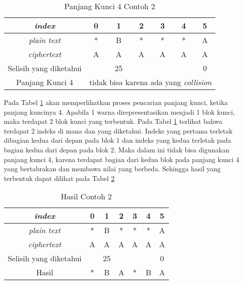 	\begin{table}[H]
	 	\centering
	 	\caption{Panjang Kunci 4 Contoh 2}
	 	\setlength{\arrayrulewidth}{.08em}
	 	\begin{tabular}{|c|c|c|c|c|c|c|}\hline
		\textit{index}&0&1&2&3&4&5\\ \hline
	 	\textit{plain text}&\cellcolor{blue!15}*&\cellcolor{blue!15}B&\cellcolor{blue!15}*&\cellcolor{blue!15}*&\cellcolor{green!15}*&\cellcolor{green!15}A\\ \hline
	 	\textit{ciphertext}&\cellcolor{blue!15}A&\cellcolor{blue!15}A&\cellcolor{blue!15}A&\cellcolor{blue!15}A&\cellcolor{green!15}A&\cellcolor{green!15}A\\ \hline
	 	Selisih yang diketahui& &25& & & &0\\ \hline
	 	Panjang Kunci 4 & \multicolumn{6}{c|}{tidak bisa karena ada yang \textit{collision}}\\ \hline
	 	\end{tabular}
	 	\label{tab:k4contoh2}
	\end{table}	
	Pada Tabel \ref{tab:k4contoh2} akan memperlihatkan proses pencarian panjang kunci, ketika panjang kuncinya 4. Apabila 1 warna direpresentasikan menjadi 1 blok kunci, maka terdapat 2 blok kunci yang terbentuk. Pada Tabel \ref{tab:k4contoh2} terlihat bahwa terdapat 2 indeks di mana \plaintext dan \ciphertext yang diketahui. Indeks yang pertama terletak dibagian kedua dari depan pada blok 1 dan indeks yang kedua terletak pada bagian kedua dari depan pada blok 2. Maka dalam ini tidak bisa digunakan panjang kunci 4, karena terdapat bagian dari kedua blok pada panjang kunci 4 yang bertabrakan dan membawa nilai yang berbeda. Sehingga hasil yang terbentuk dapat dilihat pada Tabel \ref{tab:rescontoh2}
	
	\begin{table}[H]
	 	\centering
	 	\caption{Hasil Contoh 2}
	 	\setlength{\arrayrulewidth}{.08em}
	 	\begin{tabular}{|c|c|c|c|c|c|c|}\hline
		\textit{index}&0&1&2&3&4&5\\ \hline
	 	\textit{plain text}&*&B&*&*&*&A\\ \hline
	 	\textit{ciphertext}&A&A&A&A&A&A\\ \hline
	 	Selisih yang diketahui& &25& & & &0\\ \hline
	 	Hasil &*&B&A&*&B&A \\ \hline
	 	\end{tabular}
	 	\label{tab:rescontoh2}
	\end{table}	 
	
